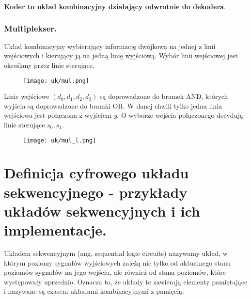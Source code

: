 \documentclass[main.tex]{subfiles}
\begin{document}
    \textbf{Koder to układ kombinacyjny działający odwrotnie do dekodera}.

    \subsubsection{Multiplekser.}
    Układ kombinacyjny wybierający informację dwójkową na jednej z linii wejściowych i kierujący ją na jedną linię
    wyjściową. Wybór linii wejściowej jest określany przez linie sterujące.

    \begin{figure}[H]
        \texttt{[image: uk/mul.png]}
    \end{figure}

    Linie wejściowe $(d_0, d_1, d_2, d_3)$ są doprowadzone do bramek AND, których wyjścia są doprowadzone do bramki
    OR. W danej chwili tylko jedna linia wejściowa jest połączona z wyjściem \textit{y}. O wyborze wejścia połączonego
    decydują linie sterujące $s_0, s_1$.

    \begin{figure}[H]
        \texttt{[image: uk/mul\_l.png]}
    \end{figure}

    \newpage

    \section{Definicja cyfrowego układu sekwencyjnego - przykłady układów sekwencyjnych i ich implementacje.}

    \begin{definition}
        Układem sekwencyjnym (ang. sequential logic circuits) nazywamy układ, w którym poziomy sygnałów wyjściowych zależą nie tylko od aktualnego stanu poziomów sygnałów na jego wejściu,
        ale również od stanu poziomów, które występowały uprzednio. Oznacza to, że układy te zawierają elementy pamiętające i nazywane są czasem układami kombinacyjnymi z pamięcią.
    \end{definition}
\end{document}
